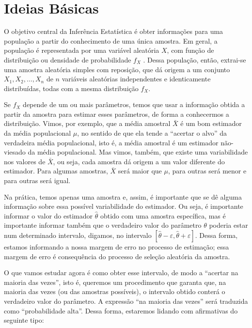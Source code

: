 \documentclass[
]{book}
\begin{document}
\hypertarget{ideias-buxe1sicas}{%
\section{Ideias Básicas}\label{ideias-buxe1sicas}}

O objetivo central da Inferência Estatística é obter informações para uma população a partir do conhecimento de uma única amostra. Em geral, a população é representada por uma variável aleatória \(X\), com função de distribuição ou densidade de probabilidade \(f_X\) . Dessa população, então, extrai-se uma amostra aleatória simples com reposição, que dá origem a um conjunto \(X_1, X_2, \ldots, X_n\) de \(n\) variáveis aleatórias independentes e identicamente distribuídas, todas com a mesma distribuição \(f_X\).

Se \(f_X\) depende de um ou mais parâmetros, temos que usar a informação obtida a partir da amostra para estimar esses parâmetros, de forma a conhecermos a distribuição. Vimos, por exemplo, que a média amostral \(\bar X\) é um bom estimador da média populacional \(\mu\), no sentido de que ela tende a ``acertar o alvo'' da verdadeira média populacional, isto é, a média amostral é um estimador não-viesado da média populacional. Mas vimos, também, que existe uma variabilidade nos valores de \(\bar X\), ou seja, cada amostra dá origem a um valor diferente do estimador. Para algumas amostras, \(\bar X\) será maior que \(\mu\), para outras será menor e para outras será igual.

Na prática, temos apenas uma amostra e, assim, é importante que se dê alguma informação sobre essa possível variabilidade do estimador. Ou seja, é importante informar o valor do estimador \(\hat \theta\) obtido com uma amostra específica, mas é importante informar também que o verdadeiro valor do parâmetro \(\theta\) poderia estar num determinado intervalo, digamos, no intervalo \(\left[\hat\theta-\varepsilon,\hat\theta+\varepsilon\right]\). Dessa forma, estamos informando a nossa margem de erro no processo de estimação; essa margem de erro é consequência do processo de seleção aleatória da amostra.

O que vamos estudar agora é como obter esse intervalo, de modo a ``acertar na maioria das vezes'', isto é, queremos um procedimento que garanta que, na maioria das vezes (ou das amostras possíveis), o intervalo obtido conterá o verdadeiro valor do parâmetro. A expressão ``na maioria das vezes'' será traduzida como ``probabilidade alta''. Dessa forma, estaremos lidando com afirmativas do seguinte tipo:
\end{document}
